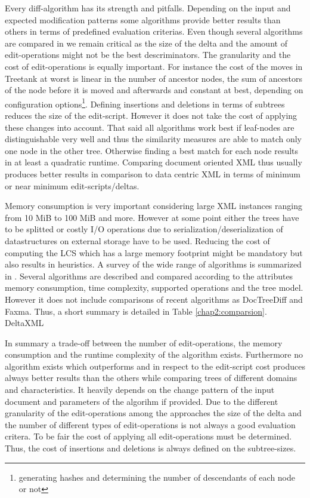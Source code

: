 Every diff-algorithm has its strength and pitfalls. Depending on the input and expected modification patterns some algorithms provide better results than others in terms of predefined evaluation criterias. Even though several algorithms are compared in \cite{ronnau2009efficient} we remain critical as the size of the delta and the amount of edit-operations might not be the best descriminators. The granularity and the cost of edit-operations is equally important. For instance the cost of the moves in Treetank at worst is linear in the number of ancestor nodes, the sum of ancestors of the node before it is moved and afterwards and constant at best, depending on configuration options\footnote{generating hashes and determining the number of descendants of each node or not}. Defining insertions and deletions in terms of subtrees reduces the size of the edit-script. However it does not take the cost of applying these changes into account. That said all algorithms work best if leaf-nodes are distinguishable very well and thus the similarity measures are able to match only one node in the other tree. Otherwise finding a best match for each node results in at least a quadratic runtime. Comparing document oriented XML thus usually produces better results in comparison to data centric XML in terms of minimum or near minimum edit-scripts/deltas.

Memory consumption is very important considering large XML instances ranging from 10 MiB to 100 MiB and more. However at some point either the trees have to be splitted or costly I/O operations due to serialization/deserialization of datastructures on external storage have to be used. Reducing the cost of computing the LCS which has a large memory footprint might be mandatory but also results in heuristics. A survey of the wide range of algorithms is summarized in \cite{cobena2002comparative}. Several algorithms are described and compared according to the attributes memory consumption, time complexity, supported operations and the tree model. However it does not include comparisons of recent algorithms as DocTreeDiff and Faxma. Thus, a short summary is detailed in Table \ref{chap2:comparsion}. DeltaXML 

In summary a trade-off between the number of edit-operations, the memory consumption and the runtime complexity of the algorithm exists. Furthermore no algorithm exists which outperforms and in respect to the edit-script cost produces always better results than the others while comparing trees of different domains and characteristics. It heavily depends on the change pattern of the input document and parameters of the algorihm if provided. Due to the different granularity of the edit-operations among the approaches the size of the delta and the number of different types of edit-operations is not always a good evaluation critera. To be fair the cost of applying all edit-operations must be determined. Thus, the cost of insertions and deletions is always defined on the subtree-sizes.

